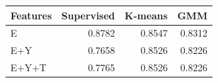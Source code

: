 \begin{tabular}{lrrr}
\toprule
Features & Supervised & K-means & GMM \\
\midrule
E & 0.8782 & 0.8547 & 0.8312 \\
E+Y & 0.7658 & 0.8526 & 0.8226 \\
E+Y+T & 0.7765 & 0.8526 & 0.8226 \\
\bottomrule
\end{tabular}
